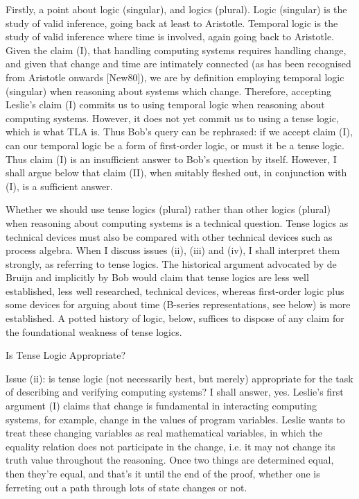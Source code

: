 \begin{spec}
Firstly, a point about logic (singular), and logics (plural).  Logic
(singular) is the study of valid inference, going back at least to
Aristotle.  Temporal logic is the study of valid inference where
time is involved, again going back to Aristotle.  Given the claim
(I), that handling computing systems requires handling change, and
given that change and time are intimately connected (as has been
recognised from Aristotle onwards [New80]), we are by definition
employing temporal logic (singular) when reasoning about systems
which change.  Therefore, accepting Leslie's claim (I) commits us to
using temporal logic when reasoning about computing systems. However,
it does not yet commit us to using a tense logic, which is what TLA
is. Thus Bob's query can be rephrased: if we accept claim (I), can
our temporal logic be a form of first-order logic, or must it be a
tense logic.  Thus claim (I) is an insufficient answer to Bob's
question by itself. However, I shall argue below that claim (II),
when suitably fleshed out, in conjunction with (I), is a sufficient
answer.

Whether we should use tense logics (plural) rather than other logics
(plural) when reasoning about computing systems is a technical
question. Tense logics as technical devices must also be compared
with other technical devices such as process algebra. When I discuss
issues (ii), (iii) and (iv), I shall interpret them strongly, as
referring to tense logics.  The historical argument advocated by de
Bruijn and implicitly by Bob would claim that tense logics are less
well established, less well researched, technical devices, whereas
first-order logic plus some devices for arguing about time (B-series
representations, see below) is more established.  A potted history
of logic, below, suffices to dispose of any claim for the
foundational weakness of tense logics.

Is Tense Logic Appropriate?

Issue (ii): is tense logic (not necessarily best, but merely)
appropriate for the task of describing and verifying computing
systems?  I shall answer, yes. Leslie's first argument (I) claims
that change is fundamental in interacting computing systems, for
example, change in the values of program variables.  Leslie wants to
treat these changing variables as real mathematical variables, in
which the equality relation does not participate in the change, i.e.
it may not change its truth value throughout the reasoning.  Once
two things are determined equal, then they're equal, and that's it
until the end of the proof, whether one is ferreting out a path
through lots of state changes or not.


\end{spec}
